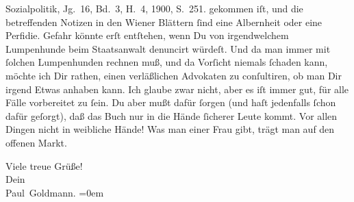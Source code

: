 {{{{                        Sozialpolitik}, Jg. 16, Bd. 3, H. 4, 1900,
                     S. 251.}}}\label{K_L02913-1} gekommen iſt, und die betreffenden Notizen in den Wiener Blättern ſind eine Albernheit oder eine
               Perfidie. Gefahr könnte erſt entſtehen, wenn Du von irgendwelchem Lumpenhunde beim
                   Staatsanwalt denuncirt würdeſt. Und da man
               immer mit ſolchen Lumpenhunden rechnen muß, und da Vorſicht niemals ſchaden kann, {\pb}möchte ich Dir rathen, einen verläßlichen Advokaten
               zu conſultiren, ob man Dir irgend Etwas anhaben kann. Ich glaube zwar nicht, aber es
               iſt immer gut, für alle Fälle  vorbereitet zu ſein.
               Du aber mußt dafür ſorgen (und haſt jedenfalls ſchon dafür geſorgt), daß das Buch nur in die Hände ſicherer
               Leute kommt. Vor allen  Dingen nicht in weibliche
               Hände! Was man einer Frau gibt, trägt man auf den offenen Markt. \label{K_L02913-2v}\label{K_L02913-2}\pend
           
\pstart
           Viele treue Grüße! {\\[\baselineskip]}Dein {\\[\baselineskip]}\spacefill\mbox{Paul Goldmann.}\pend
           \leftskip=0em{}\endnumbering{}  
      